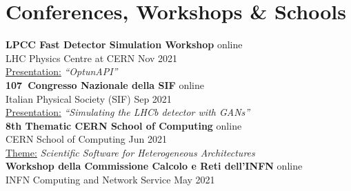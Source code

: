 \newcommand{\event}[2]
  {\normalsize \textbf{\color{hlcolor-0} #1} \hfill {\color{hlcolor-2} #2}}
  
\newcommand{\organizer}[2]
  {\small \color{hlcolor-1} {#1} \hfill {#2}}
  
\newcommand{\contribution}[3][]
  {\normalsize \color{maincolor} \ul{#2:} \emph{``#3''} {#1}}
  
\newcommand{\theme}[1]
  {\normalsize \color{maincolor} \ul{Theme:} \emph{#1}}
  
\newcommand{\button}[2]
  {\large \color{maincolor} \href{#1}{#2}}
  

\section*{Conferences, Workshops \& Schools}
\begin{cvcontent}
  \event{LPCC Fast Detector Simulation Workshop}{online}\\
  \organizer{LHC Physics Centre at CERN}{Nov 2021}\\
  \contribution{Presentation}{OptunAPI} \hfill
  \button{https://indico.cern.ch/event/1087522/contributions/4621867/attachments/2350079/4009450/20211122_LPCC_Tuning_LHCb_Barbetti.pdf}{\faFilePdf[regular]}
  \button{https://indico.cern.ch/event/1087522/}{\faGlobe}
  \\ [4mm]
  \event{107\textdegree\ Congresso Nazionale della SIF}{online}\\
  \organizer{Italian Physical Society (SIF)}{Sep 2021}\\
  \contribution{Presentation}{Simulating the LHCb detector with GANs} \hfill
  \button{https://materiali.jmax.pics/materiale/simulating-the-lhcb-detector-with-generative-adversarial-networks/?u=2445}{\faFilm}
  \\ [4mm]
  \event{8th Thematic CERN School of Computing}{online}\\
  \organizer{CERN School of Computing}{Jun 2021}\\
  \theme{Scientific Software for Heterogeneous Architectures} \hfill
  \button{https://indico.cern.ch/event/1017080/}{\faGlobe}
  \\ [4mm]
  \event{Workshop della Commissione Calcolo e Reti dell'INFN}{online}\\
  \organizer{INFN Computing and Network Service}{May 2021}\\

\end{cvcontent}
